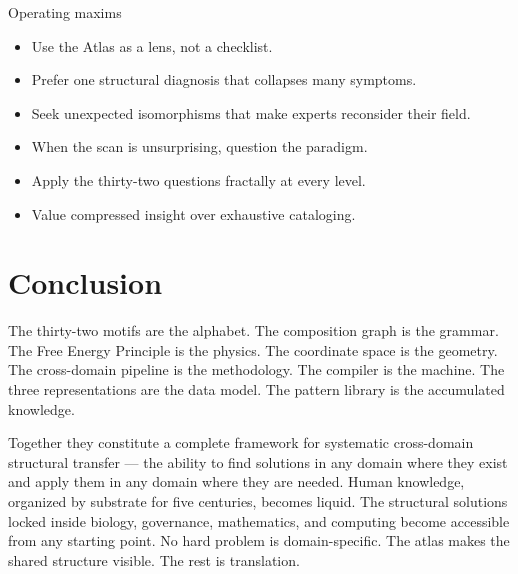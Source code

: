 \documentclass[11pt,a4paper]{article}
\begin{document}
\begin{principlebox}{Operating maxims}
\begin{itemize}[nosep]
\item Use the Atlas as a lens, not a checklist.
\item Prefer one structural diagnosis that collapses many symptoms.
\item Seek unexpected isomorphisms that make experts reconsider their field.
\item When the scan is unsurprising, question the paradigm.
\item Apply the thirty-two questions fractally at every level.
\item Value compressed insight over exhaustive cataloging.
\end{itemize}
\end{principlebox}

\section{Conclusion}

The thirty-two motifs are the alphabet. The composition graph is the grammar. The Free Energy Principle is the physics. The coordinate space is the geometry. The cross-domain pipeline is the methodology. The compiler is the machine. The three representations are the data model. The pattern library is the accumulated knowledge.

Together they constitute a complete framework for systematic cross-domain structural transfer --- the ability to find solutions in any domain where they exist and apply them in any domain where they are needed. Human knowledge, organized by substrate for five centuries, becomes liquid. The structural solutions locked inside biology, governance, mathematics, and computing become accessible from any starting point. No hard problem is domain-specific. The atlas makes the shared structure visible. The rest is translation.
\end{document}
